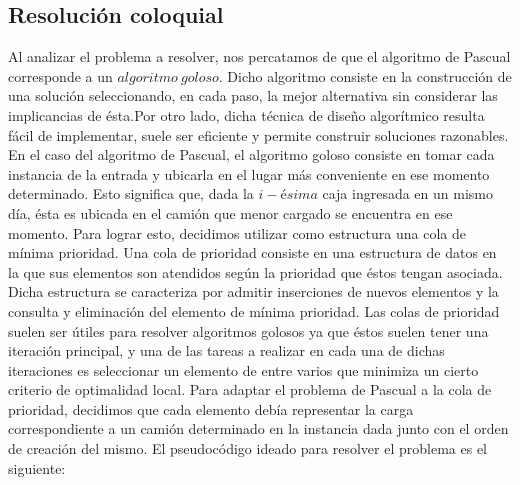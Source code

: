 \subsection{Resolución coloquial}
Al analizar el problema a resolver, nos percatamos de que el algoritmo de Pascual corresponde a un $algoritmo\ goloso$. Dicho algoritmo consiste en la construcción de una solución seleccionando, en cada paso, la mejor alternativa sin considerar las implicancias de ésta.\newline Por otro lado, dicha técnica de diseño algorítmico resulta fácil de implementar, suele ser eficiente y permite construir soluciones razonables.\newline
\newline
En el caso del algoritmo de Pascual, el algoritmo goloso consiste en tomar cada instancia de la entrada y ubicarla en el lugar más conveniente en ese momento determinado. Esto significa que, dada la $i-ésima$ caja ingresada en un mismo día, ésta es ubicada en el camión que menor cargado se encuentra en ese momento. Para lograr esto, decidimos utilizar como estructura una cola de mínima prioridad.\newline
\newline
Una cola de prioridad consiste en una estructura de datos en la que sus elementos son atendidos según la prioridad que éstos tengan asociada. Dicha estructura se caracteriza por admitir inserciones de nuevos elementos y la consulta y eliminación del elemento de mínima prioridad.\newline
Las colas de prioridad suelen ser útiles para resolver algoritmos golosos ya que éstos suelen tener una iteración principal, y una de las tareas a realizar en cada una de dichas iteraciones es seleccionar un elemento de entre varios que minimiza un cierto criterio de optimalidad local.\newline
Para adaptar el problema de Pascual a la cola de prioridad, decidimos que cada elemento debía representar la carga correspondiente a un camión determinado en la instancia dada junto con el orden de creación del mismo.\newline
\newline
El pseudocódigo ideado para resolver el problema es el siguiente:\newline

